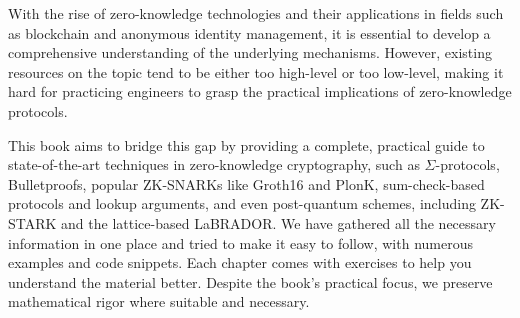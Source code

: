 With the rise of zero-knowledge technologies and their applications in fields such as blockchain and anonymous identity management, it is essential to develop a comprehensive understanding of the underlying mechanisms.
However, existing resources on the topic tend to be either too high-level or too low-level, making it hard for practicing engineers to grasp the practical implications of zero-knowledge protocols.

This book aims to bridge this gap by providing a complete, practical guide to state-of-the-art techniques in zero-knowledge cryptography, such as $\Sigma$-protocols, Bulletproofs, popular ZK-SNARKs like Groth16 and PlonK, sum-check-based protocols and lookup arguments, and even post-quantum schemes, including ZK-STARK and the lattice-based LaBRADOR.
We have gathered all the necessary information in one place and tried to make it easy to follow, with numerous examples and code snippets.
Each chapter comes with exercises to help you understand the material better.
Despite the book's practical focus, we preserve mathematical rigor where suitable and necessary.
